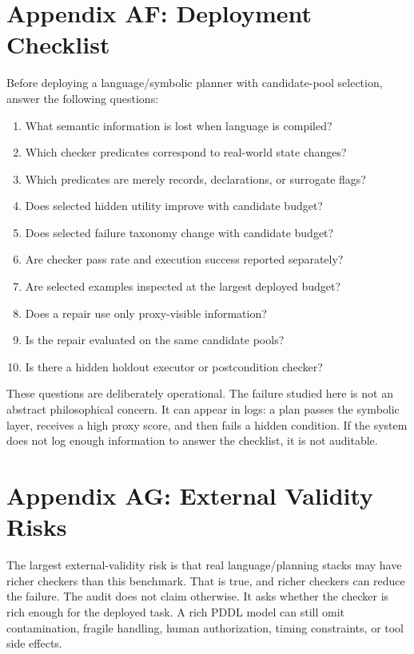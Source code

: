 \documentclass{article}
\begin{document}
\section*{Appendix AF: Deployment Checklist}

Before deploying a language/symbolic planner with candidate-pool selection,
answer the following questions:
\begin{enumerate}
  \item What semantic information is lost when language is compiled?
  \item Which checker predicates correspond to real-world state changes?
  \item Which predicates are merely records, declarations, or surrogate flags?
  \item Does selected hidden utility improve with candidate budget?
  \item Does selected failure taxonomy change with candidate budget?
  \item Are checker pass rate and execution success reported separately?
  \item Are selected examples inspected at the largest deployed budget?
  \item Does a repair use only proxy-visible information?
  \item Is the repair evaluated on the same candidate pools?
  \item Is there a hidden holdout executor or postcondition checker?
\end{enumerate}

These questions are deliberately operational. The failure studied here is not
an abstract philosophical concern. It can appear in logs: a plan passes the
symbolic layer, receives a high proxy score, and then fails a hidden condition.
If the system does not log enough information to answer the checklist, it is
not auditable.

\section*{Appendix AG: External Validity Risks}

The largest external-validity risk is that real language/planning stacks may
have richer checkers than this benchmark. That is true, and richer checkers can
reduce the failure. The audit does not claim otherwise. It asks whether the
checker is rich enough for the deployed task. A rich PDDL model can still omit
contamination, fragile handling, human authorization, timing constraints, or
tool side effects.
\end{document}
